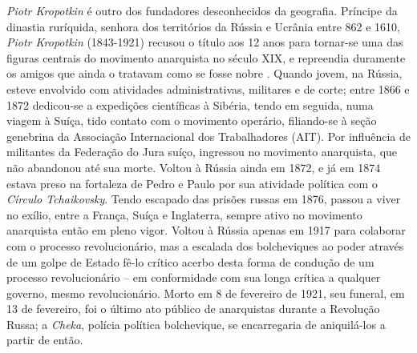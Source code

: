 \textit{Piotr Kropotkin} é outro dos fundadores desconhecidos da geografia. Príncipe da dinastia ruríquida, senhora dos territórios da Rússia e Ucrânia entre 862 e 1610, \textit{Piotr Kropotkin }(1843-1921) recusou o título aos 12 anos para tornar-se uma das figuras centrais do movimento anarquista no século XIX, e repreendia duramente os amigos que ainda o tratavam como se fosse nobre \cite[p.~13]{baldwin_story_1970}. Quando jovem, na Rússia, esteve envolvido com atividades administrativas, militares e de corte; entre 1866 e 1872 dedicou-se a expedições científicas à Sibéria, tendo em seguida, numa viagem à  Suíça, tido contato com o movimento operário, filiando-se à seção genebrina da Associação Internacional dos Trabalhadores (AIT). Por influência de militantes da Federação do Jura suíço, ingressou no movimento anarquista, que não abandonou até sua morte. Voltou à Rússia ainda em 1872, e já em 1874 estava preso na fortaleza de Pedro e Paulo por sua atividade política com o \textit{Círculo Tchaikovsky}. Tendo escapado das prisões russas em 1876, passou a viver no exílio, entre a França, Suíça e Inglaterra, sempre ativo no movimento anarquista então em pleno vigor. Voltou à Rússia apenas em 1917 para colaborar com o processo revolucionário, mas a escalada dos bolcheviques ao poder através de um golpe de Estado fê-lo crítico acerbo desta forma de condução de um processo revolucionário -- em conformidade com sua longa crítica a qualquer governo, mesmo revolucionário. Morto em 8 de fevereiro de 1921, seu funeral, em 13 de fevereiro, foi o último ato público de anarquistas durante a Revolução Russa; a \textit{Cheka}, polícia política bolchevique, se encarregaria de aniquilá-los a partir de então.


